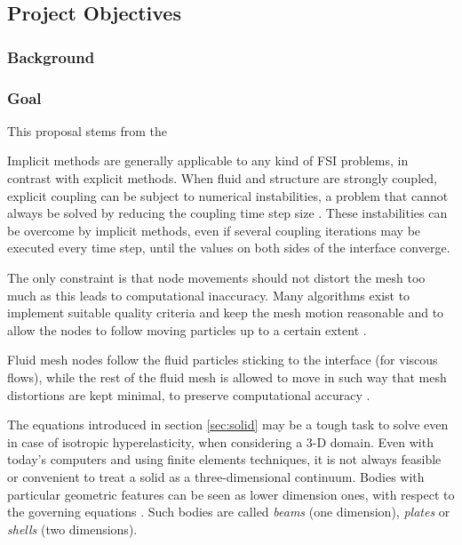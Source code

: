 \subsection*{Project Objectives}


\subsubsection*{Background}


\subsubsection*{Goal}

This proposal stems from the 


Implicit methods are generally applicable to any kind of FSI problems, in contrast with explicit methods. When fluid and structure are strongly coupled, explicit coupling can be subject to numerical instabilities, a problem that cannot always be solved by reducing the coupling time step size \cite{van2009added}. These instabilities can be overcome by implicit methods, even if several coupling iterations may be executed every time step, until the values on both sides of the interface converge.

The only constraint is that node movements should not distort the mesh too much as this leads to computational inaccuracy. Many algorithms exist to implement suitable quality criteria and keep the mesh motion reasonable and to allow the nodes to follow moving particles up to a certain extent \cite{de2007mesh}.

Fluid mesh nodes follow the fluid particles sticking to the interface (for viscous flows), while the rest of the fluid mesh is allowed to move in such way that mesh distortions are kept minimal, to preserve computational accuracy \cite{ramm1998fluid}.


The equations introduced in section \ref{sec:solid} may be a tough task to solve even in case of isotropic hyperelasticity, when considering a 3-D domain. Even with today's computers and using finite elements techniques, it is not always feasible or convenient to treat a solid as a three-dimensional continuum. Bodies with particular geometric features can be seen as lower dimension ones, with respect to the governing equations \cite{hjelmstad2007fundamentals}. Such bodies are called \textit{beams} (one dimension), \textit{plates} or \textit{shells} (two dimensions).

